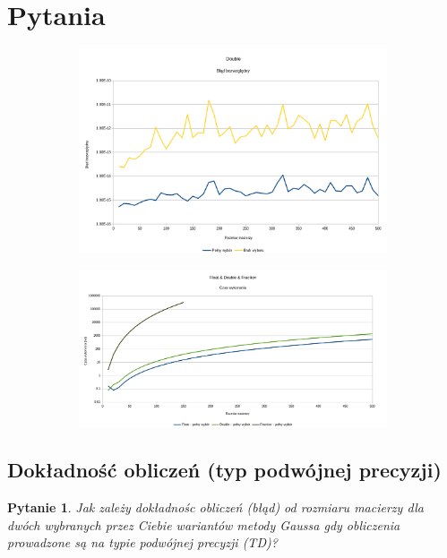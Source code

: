 \documentclass[10pt]{article}
\newtheorem{que}{Pytanie}
\begin{document}
\section{Pytania}
\begin{figure}[h]
	\caption{Wykresy reprezentujące błąd bezwzględny dla różnych sposobów sumowania}
	\begin{subfigure}{0.5\textwidth}
		\includegraphics[width=\textwidth]{double_full_none_blad.png}
		\caption{ \label{Rys2a}}
	\end{subfigure}
	\hfill
	\begin{subfigure}{0.5\textwidth}
		\includegraphics[width=\textwidth]{float_double_fract_full_czas.png}
		\caption{  \label{Rys2b}}
	\end{subfigure}
\end{figure}
\subsection{Dokładność obliczeń (typ podwójnej precyzji)}
\begin{que}
	Jak zależy dokładnośc obliczeń (błąd) od rozmiaru macierzy dla dwóch wybranych
	przez Ciebie wariantów metody Gaussa gdy obliczenia prowadzone są na typie
	podwójnej precyzji (TD)?\label{que:1}
\end{que}
\end{document}
